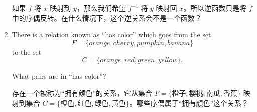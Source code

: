 \begin{enumerate}
{    如果 $f$ 将 $x$ 映射到 $y$，那么我们希望 $f^{-1}$ 将 $y$ 映射回 $x$。所以逆函数只是将 $f$ 中的序偶反转。在什么情况下，这个逆关系会不是一个函数？}
    
    \wbvfill
    
    \workbookpagebreak
    
    \item There is a relation known as ``has color'' which goes from the
    set 
    \[ F = \{orange, cherry, pumpkin, banana\} \]
    to the set 
    \[ C = \{orange, red, green, yellow\}.
    \]
    
    \noindent  What pairs are in ``has color''?
    
    存在一个被称为“拥有颜色”的关系，它从集合 $F = \{橙子, 樱桃, 南瓜, 香蕉\}$ 映射到集合 $C = \{橙色, 红色, 绿色, 黄色\}$。哪些序偶属于“拥有颜色”这个关系？
       
    
    \wbvfill
    
    \end{enumerate}
